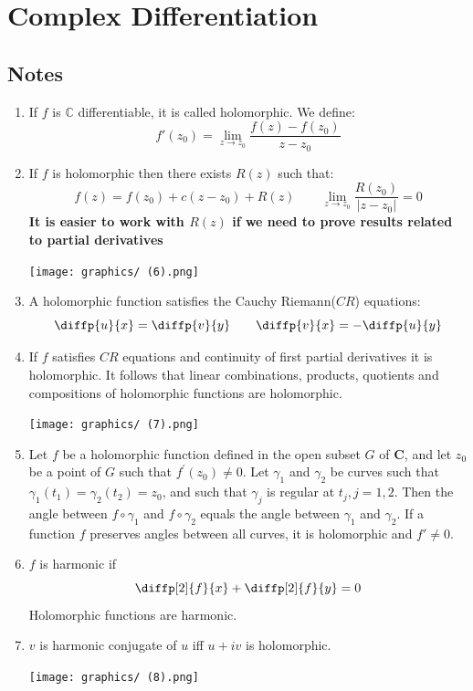 \documentclass[12pt,oneside]{book}
\begin{document}
\chapter{Complex Differentiation}
\section{Notes}
\begin{enumerate}
    \item If $f$ is $\mathbb C$ differentiable, it is called holomorphic. We define:
    $$f'(z_0)=\lim_{z\to z_0}\frac{f(z)-f(z_0)}{z-z_0}$$
    \item If $f$ is holomorphic then there exists $R(z)$ such that:
        $$f(z)=f(z_0)+c(z-z_0)+R(z)\qquad \lim_{z\to z_0}\frac{R(z_0)}{|z-z_0|}=0$$
        \textbf{It is easier to work with $R(z)$ if we need to prove results related to partial derivatives}
        \begin{marginfigure}%
            \texttt{[image: graphics/ (6).png]}
        \end{marginfigure}%
    \item A holomorphic function satisfies the Cauchy Riemann($CR$) equations:
    $$\diffp{u}{x}=\diffp{v}{y}\qquad \diffp{v}{x}=-\diffp{u}{y}$$
    \item If $f$ satisfies $CR$ equations and continuity of first partial derivatives it is holomorphic. It follows that linear combinations, products, quotients and compositions of holomorphic functions are holomorphic. 
    \begin{marginfigure}%
        \texttt{[image: graphics/ (7).png]}
    \end{marginfigure}%
    \item  Let $f$ be a holomorphic function defined in the open subset $G$ of $\mathbf{C}$, and let $z_0$ be a point of $G$ such that $f^{\prime}\left(z_0\right) \neq 0$. Let $\gamma_1$ and $\gamma_2$ be curves such that $\gamma_1\left(t_1\right)=\gamma_2\left(t_2\right)=z_0$, and such that $\gamma_j$ is regular at $t_j, j=1,2$. Then the angle between $f \circ \gamma_1$ and $f \circ \gamma_2$ equals the angle between $\gamma_1$ and $\gamma_2$. If a function $f$ preserves angles between all curves, it is holomorphic and $f'\ne0$.
    \item $f$ is harmonic if
        $$\diffp[2]{f}{x}+\diffp[2]{f}{y}=0$$
        Holomorphic functions are harmonic.
    \item $v$ is harmonic conjugate of $u$ iff $u+iv$ is holomorphic.
    \begin{marginfigure}%
        \texttt{[image: graphics/ (8).png]}
    \end{marginfigure}%
\end{enumerate}
\end{document}
